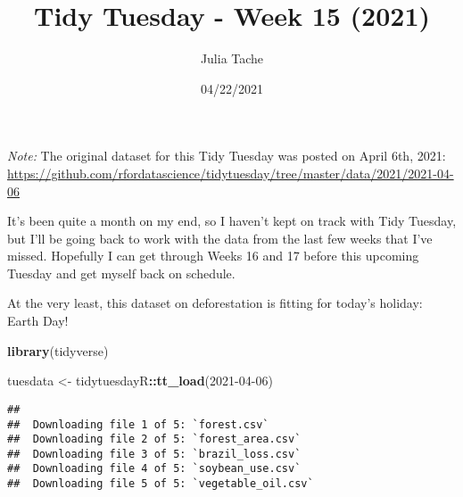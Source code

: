 \documentclass[
]{article}
\title{Tidy Tuesday - Week 15 (2021)}
\author{Julia Tache}
\date{04/22/2021}
\newenvironment{Shaded}{\begin{snugshade}}{\end{snugshade}}
\newcommand{\KeywordTok}[1]{\textcolor[rgb]{0.13,0.29,0.53}{\textbf{#1}}}
\newcommand{\NormalTok}[1]{#1}
\newcommand{\OperatorTok}[1]{\textcolor[rgb]{0.81,0.36,0.00}{\textbf{#1}}}
\newcommand{\StringTok}[1]{\textcolor[rgb]{0.31,0.60,0.02}{#1}}
\begin{document}
\maketitle

\emph{Note:} The original dataset for this Tidy Tuesday was posted on
April 6th, 2021:
\url{https://github.com/rfordatascience/tidytuesday/tree/master/data/2021/2021-04-06}

It's been quite a month on my end, so I haven't kept on track with Tidy
Tuesday, but I'll be going back to work with the data from the last few
weeks that I've missed. Hopefully I can get through Weeks 16 and 17
before this upcoming Tuesday and get myself back on schedule.

At the very least, this dataset on deforestation is fitting for today's
holiday: Earth Day!

\begin{Shaded}
\begin{Highlighting}[]
\KeywordTok{library}\NormalTok{(tidyverse)}

\NormalTok{tuesdata \textless{}{-}}\StringTok{ }\NormalTok{tidytuesdayR}\OperatorTok{::}\KeywordTok{tt\_load}\NormalTok{(}\StringTok{\textquotesingle{}2021{-}04{-}06\textquotesingle{}}\NormalTok{)}
\end{Highlighting}
\end{Shaded}

\begin{verbatim}
## 
##  Downloading file 1 of 5: `forest.csv`
##  Downloading file 2 of 5: `forest_area.csv`
##  Downloading file 3 of 5: `brazil_loss.csv`
##  Downloading file 4 of 5: `soybean_use.csv`
##  Downloading file 5 of 5: `vegetable_oil.csv`
\end{verbatim}

\begin{Shaded}
\end{Shaded}
\end{document}
